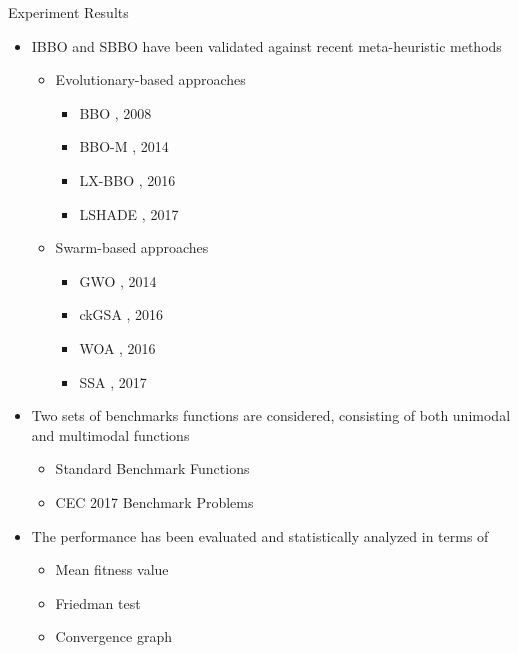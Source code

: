 \documentclass [9pt,times] {beamer}
\begin{document}
\begin{frame}{Experiment Results}

\begin{itemize}
\justifying
\fontsize{7pt}{9pt}\selectfont
\item  IBBO and SBBO have been validated against recent meta-heuristic methods
	\begin{itemize}

		\item Evolutionary-based approaches
			\begin{itemize}

				\item BBO \cite{simon2008}, 2008
				\item BBO-M \cite{Niu2014}, 2014
				\item LX-BBO \cite{Garg2016}, 2016 
				\item LSHADE \cite{Mohamed2017}, 2017
			\end{itemize}
		\item Swarm-based approaches
			\begin{itemize}

				\item GWO \cite{mirjalili2014}, 2014 
				\item ckGSA \cite{mittal2016}, 2016
				\item WOA \cite{mirjalili2016}, 2016
				\item SSA \cite{Mirjalili2017}, 2017
			\end{itemize}
	\end{itemize}
	
\item Two sets of benchmarks functions are considered, consisting of both unimodal and multimodal functions
		\begin{itemize}

			\item Standard Benchmark Functions
			\item CEC 2017 Benchmark Problems
		\end{itemize}

\item The performance has been evaluated and statistically analyzed in terms of
		\begin{itemize}

				\item  Mean fitness value
				\item Friedman test
				\item Convergence graph
				
	   \end{itemize}

\end{itemize}
\end{frame}
\end{document}
